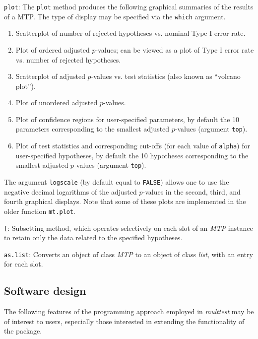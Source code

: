 \documentclass[11pt]{article}
\newcommand{\Rpackage}[1]{\textit{#1}}
\newcommand{\Robject}[1]{\texttt{#1}}
\newcommand{\Rclass}[1]{\textit{#1}}
\begin{document}
\begin{description}
\item{\Robject{plot}:}   
The \Robject{plot} method produces the following graphical summaries of the results of a MTP. The type of display may be specified via the \Robject{which} argument.
\begin{enumerate}
\item
Scatterplot of number of rejected hypotheses vs. nominal Type I error rate.
\item
Plot of ordered adjusted $p$-values; can be viewed as a plot of Type I error rate vs. number of rejected hypotheses.
\item
Scatterplot of adjusted $p$-values vs. test statistics (also known as ``volcano plot'').
\item
Plot of unordered adjusted $p$-values.
\item
Plot of confidence regions for user-specified parameters, by default the 10 parameters corresponding to the smallest adjusted $p$-values  (argument \Robject{top}).
\item
Plot of test statistics and corresponding cut-offs (for each value of \Robject{alpha}) for user-specified hypotheses, by default the 10 hypotheses corresponding to the smallest adjusted $p$-values (argument \Robject{top}).
\end{enumerate}
The argument \Robject{logscale} (by default equal to \Robject{FALSE}) allows one to use the negative decimal logarithms of the adjusted $p$-values in the second, third, and fourth graphical displays.
Note that some of these plots are implemented in the older function \Robject{mt.plot}.

\item{\Robject{[}:} 
Subsetting method, which operates selectively on each slot of an \Rclass{MTP} instance to retain only the data related to the specified hypotheses.

\item{\Robject{as.list}:} 
Converts an object of class \Rclass{MTP} to an object of class \Rclass{list}, with an entry for each slot. 

\end{description}


\subsection{Software design}
\label{anal:mult:s:design}

The following features of the programming approach employed in \Rpackage{multtest} may be of interest to users, especially those interested in extending the functionality of the package. \\
\end{document}
